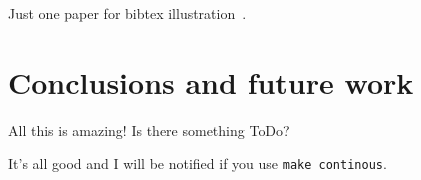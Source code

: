 
Just one paper for bibtex illustration~\cite{rogers1967person}.

\section{Conclusions and future work}
\label{sec:concl}
All this is amazing!
Is there something ToDo?

It's all good and I will be notified if you use {\tt make continous}.

